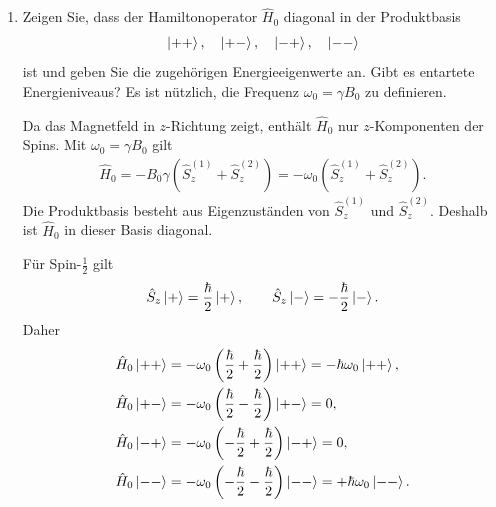 \documentclass[11pt,a4paper]{scrartcl}
\newcommand{\op}[1]{\hat{#1}}
\begin{document}
    \begin{enumerate}[label=(\alph*)]
        \item Zeigen Sie, dass der Hamiltonoperator $\op H_0$ diagonal in der Produktbasis
        \begin{align*}
            \ket{++},\quad \ket{+-},\quad \ket{-+},\quad \ket{--}
        \end{align*}
        ist und geben Sie die zugehörigen Energieeigenwerte an. Gibt es entartete Energieniveaus? Es ist nützlich, die Frequenz $\omega_0=\gamma B_0$ zu definieren.

        \begin{calculationbox}
            Da das Magnetfeld in $z$-Richtung zeigt, enthält $\op H_0$ nur $z$-Komponenten der Spins. Mit $\omega_0=\gamma B_0$ gilt
            \begin{align*}
                \op H_0
                =
                -B_0\gamma(\op S_z^{(1)}+\op S_z^{(2)})
                =
                -\omega_0(\op S_z^{(1)}+\op S_z^{(2)}).
            \end{align*}
            Die Produktbasis besteht aus Eigenzuständen von $\op S_z^{(1)}$ und $\op S_z^{(2)}$. Deshalb ist $\op H_0$ in dieser Basis diagonal.

            \begin{calculationbox}[title=Energieeigenwerte]
                Für Spin-$\frac12$ gilt
                \begin{align*}
                    \op S_z\ket+=\frac{\hbar}{2}\ket+,
                    \qquad
                    \op S_z\ket-=-\frac{\hbar}{2}\ket-.
                \end{align*}
                Daher
                \begin{align*}
                    \op H_0\ket{++}
                    &=-\omega_0\left(\frac{\hbar}{2}+\frac{\hbar}{2}\right)\ket{++}
                    =-\hbar\omega_0\ket{++},\\
                    \op H_0\ket{+-}
                    &=-\omega_0\left(\frac{\hbar}{2}-\frac{\hbar}{2}\right)\ket{+-}
                    =0,\\
                    \op H_0\ket{-+}
                    &=-\omega_0\left(-\frac{\hbar}{2}+\frac{\hbar}{2}\right)\ket{-+}
                    =0,\\
                    \op H_0\ket{--}
                    &=-\omega_0\left(-\frac{\hbar}{2}-\frac{\hbar}{2}\right)\ket{--}
                    =+\hbar\omega_0\ket{--}.
                \end{align*}


\end{calculationbox}
\end{calculationbox}
\end{enumerate}
\end{document}

